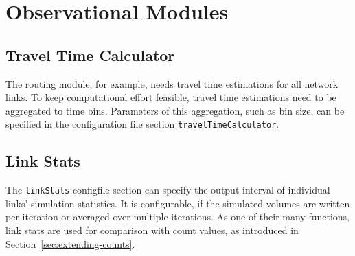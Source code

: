 \section{Observational Modules}
\label{sec:observational}

\subsection{Travel Time Calculator}
\label{sec:ttc}
The routing module, for example, needs travel time estimations for all network links. To keep  computational effort feasible, travel time estimations need to be aggregated to time bins. Parameters of this aggregation, such as bin size, can be specified in the configuration file section \lstinline|travelTimeCalculator|.

\subsection{Link Stats}
\label{sec:linkStats}
The \lstinline|linkStats| \gls{configfile} section can specify the output interval of individual links' simulation statistics. It is configurable, if the simulated volumes are written per iteration or averaged over multiple iterations. As one of their many functions, link stats are used for comparison with count values, as introduced in Section~\ref{sec:extending-counts}. 

